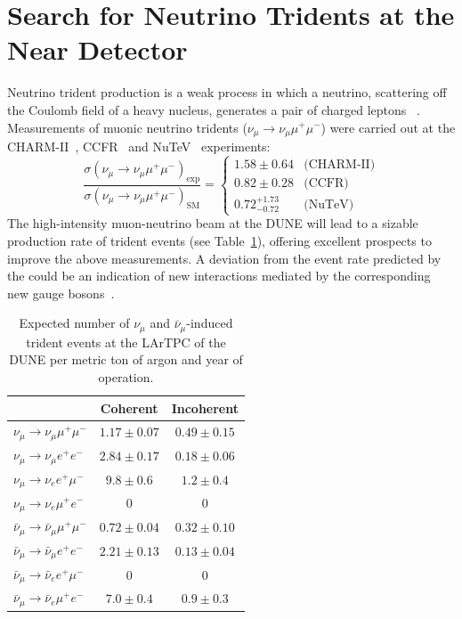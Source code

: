 \section{Search for Neutrino Tridents at the Near Detector}
Neutrino trident production is a weak process in which a neutrino, scattering off the Coulomb field of a heavy nucleus, generates a pair of charged leptons ~\cite{Czyz:1964zz,Lovseth:1971vv,Fujikawa:1971nx,Koike:1971tu,Koike:1971vg,Brown:1973ih,Belusevic:1987cw}. Measurements of muonic neutrino tridents ($\nu_\mu \to \nu_\mu \mu^+\mu^-$) were carried out at the CHARM-II~\cite{Geiregat:1990gz}, CCFR~\cite{Mishra:1991bv} and NuTeV~\cite{Adams:1999mn} experiments:
\[
\frac{\sigma(\nu_\mu \to \nu_\mu \mu^+\mu^-)_\text{exp}}{\sigma(\nu_\mu \to \nu_\mu \mu^+\mu^-)_\text{SM}} = 
\begin{cases}
1.58 \pm 0.64         & \text{(CHARM-II)} \\ 
0.82 \pm 0.28         & \text{(CCFR)} \\
0.72 ^{+1.73}_{-0.72} & \text{(NuTeV)} 
\end{cases}
\]
The high-intensity muon-neutrino beam at the DUNE   will lead to a sizable production rate of trident events (see Table~\ref{tab:trident_rates}), offering excellent prospects to improve the above measurements. A deviation from the event rate predicted by the  could be an indication of new interactions mediated by the corresponding new gauge bosons~\cite{Altmannshofer:2014pba}. 

\begin{table}[!b]
\begin{center}
\begin{tabular}{lcc}
\toprule
& Coherent & Incoherent \\
\midrule
$\nu_\mu \to \nu_\mu \mu^+\mu^-$ & $1.17 \pm 0.07$ & $0.49 \pm 0.15$ \\
$\nu_\mu \to \nu_\mu e^+e^-$ & $2.84 \pm 0.17$ & $0.18 \pm 0.06$\\
$\nu_\mu \to \nu_e e^+\mu^-$ & $9.8 \pm 0.6$ & $1.2 \pm 0.4$ \\
$\nu_\mu \to \nu_e \mu^+e^-$ & $0$ & $0$ \\
\midrule
$\bar\nu_\mu \to \bar\nu_\mu \mu^+\mu^-$ & $0.72 \pm 0.04$ & $0.32 \pm 0.10$ \\
$\bar\nu_\mu \to \bar\nu_\mu e^+e^-$ & $2.21 \pm 0.13$ & $0.13 \pm 0.04$ \\
$\bar\nu_\mu \to \bar\nu_e e^+\mu^-$ & $0$ & $0$ \\
$\bar\nu_\mu \to \bar\nu_e \mu^+e^-$ & $7.0 \pm 0.4$ & $0.9 \pm 0.3$ \\
\bottomrule
\end{tabular}
\end{center}
\caption[Expected number of  $\nu_\mu$ and $\bar\nu_\mu$-induced trident events at  per ton of argon and year of operation]{Expected number of  $\nu_\mu$ and $\bar\nu_\mu$-induced trident events at the LArTPC of the DUNE  per metric ton of argon and year of operation.}
\label{tab:trident_rates}
\end{table}


